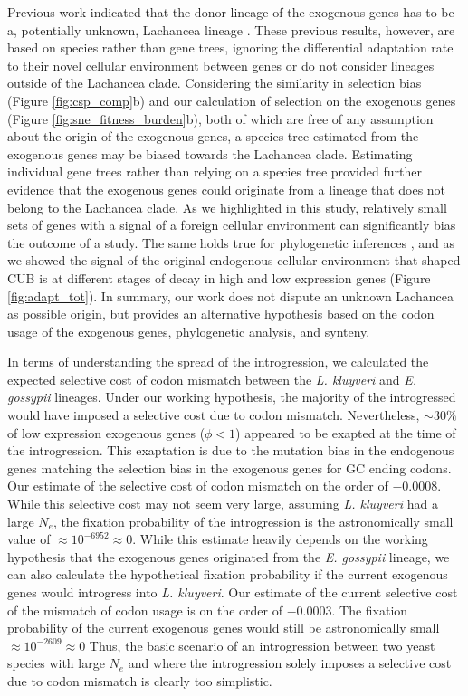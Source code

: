 \documentclass[doublespacing,linenumbers]{bmcart}
\newcommand{\kluyveri}{\textit{L. kluyveri}\xspace}
\newcommand{\gossypii}{\textit{E. gossypii}\xspace}
\newcommand{\Ne}{\ensuremath{N_e}\xspace}
\begin{document}
Previous work indicated that the donor lineage of the exogenous genes has to be a, potentially unknown, Lachancea lineage \citep{payen2009, friedrich2015, vakirlis2016, brion2017}.
These previous results, however, are based on species rather than gene trees, ignoring the differential adaptation rate to their novel cellular environment between genes or do not consider lineages outside of the Lachancea clade.
Considering the similarity in selection bias (Figure \ref{fig:csp_comp}b) and our calculation of selection on the exogenous genes (Figure \ref{fig:sne_fitness_burden}b), both of which are free of any assumption about the origin of the exogenous genes, a species tree estimated from the exogenous genes may be biased towards the Lachancea clade.
Estimating individual gene trees rather than relying on a species tree provided further evidence that the exogenous genes could originate from a lineage that does not belong to the Lachancea clade.
As we highlighted in this study, relatively small sets of genes with a signal of a foreign cellular environment can significantly bias the outcome of a study. 
The same holds true for phylogenetic inferences \citep{salichos2013}, and as we showed the signal of the original endogenous cellular environment that shaped CUB is at different stages of decay in high and low expression genes (Figure \ref{fig:adapt_tot}).
In summary, our work does not dispute an unknown Lachancea as possible origin, but provides an alternative hypothesis based on the codon usage of the exogenous genes, phylogenetic analysis, and synteny.

In terms of understanding the spread of the introgression, we calculated the expected selective cost of codon mismatch between the \kluyveri and \gossypii lineages.
Under our working hypothesis, the majority of the introgressed would have imposed a selective cost due to codon mismatch.
Nevertheless, $\sim 30 \%$ of low expression exogenous genes ($\phi < 1$) appeared to be exapted at the time of the introgression.
This exaptation is due to the mutation bias in the endogenous genes matching the selection bias in the exogenous genes for GC ending codons.
Our estimate of the selective cost of codon mismatch on the order of $-0.0008$.
While this selective cost may not seem very large, assuming \kluyveri had a large \Ne, the fixation probability of the introgression is the astronomically small value of $\approx 10^{-6952} \approx 0$.
While this estimate heavily depends on the working hypothesis that the exogenous genes originated from the \gossypii lineage, we can also calculate the hypothetical fixation probability if the current exogenous genes would introgress into \kluyveri. 
Our estimate of the current selective cost of the mismatch of codon usage is on the order of $-0.0003$.
The fixation probability of the current exogenous genes would still be astronomically small $\approx 10^{-2609} \approx 0$
Thus, the basic scenario of an introgression between two yeast species with large \Ne and where the introgression solely imposes a selective cost due to codon mismatch is clearly too simplistic.
\end{document}
